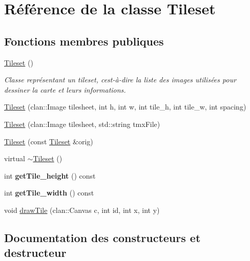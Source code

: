 \hypertarget{classTileset}{}\section{Référence de la classe Tileset}
\label{classTileset}
\subsection*{Fonctions membres publiques}
\begin{DoxyCompactItemize}
\item 
\hyperlink{classTileset_a9b75b605d834e3c9e25fb1c2429a36f6}{Tileset} ()
\begin{DoxyCompactList}\small\item\em Classe représentant un tileset, c\textquotesingle{}est-\/à-\/dire la liste des images utilisées pour dessiner la carte et leurs informations. \end{DoxyCompactList}\item 
\hyperlink{classTileset_ab9bd53a57698359f4ed3ff3d51370666}{Tileset} (clan\+::\+Image tilesheet, int h, int w, int tile\+\_\+h, int tile\+\_\+w, int spacing)
\item 
\hyperlink{classTileset_aa84d0a1454e7ca41989970371af95296}{Tileset} (clan\+::\+Image tilesheet, std\+::string tmx\+File)
\item 
\hyperlink{classTileset_a2a8acb9867fb31574cffa0c0ef8bd980}{Tileset} (const \hyperlink{classTileset}{Tileset} \&orig)
\item 
virtual \hyperlink{classTileset_afbb53f34f87b8b9c1f575349e89a6cd5}{$\sim$\+Tileset} ()
\item 
\hypertarget{classTileset_a81c24ec86c6b52a4f69f983571fecac5}{}int {\bfseries get\+Tile\+\_\+height} () const \label{classTileset_a81c24ec86c6b52a4f69f983571fecac5}

\item 
\hypertarget{classTileset_a3cf00412804a3f5210767cac1e0556eb}{}int {\bfseries get\+Tile\+\_\+width} () const \label{classTileset_a3cf00412804a3f5210767cac1e0556eb}

\item 
void \hyperlink{classTileset_a564a51b3a420ec234190e77e6b6acc1c}{draw\+Tile} (clan\+::\+Canvas c, int id, int x, int y)
\end{DoxyCompactItemize}


\subsection{Documentation des constructeurs et destructeur}
\hypertarget{classTileset_a9b75b605d834e3c9e25fb1c2429a36f6}{}

